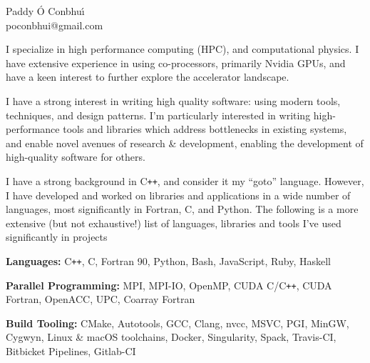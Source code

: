 \documentclass[11pt]{article}
\newcommand{\resumeSection}[1]{
    \par
    \large {\sc {#1}}
    \par
    \vspace{-0.9\baselineskip}
    \hrulefill
    \vspace{0.25\baselineskip}
    \par
}
\newenvironment{resumeSubSectionBody}{
    \par
    \vspace{-0.4\parskip}
    \begin{small}
    \par
} {
    \par
    \end{small}
    \par
}
\newenvironment{resumeDescription}{
    \vspace{-0.5\baselineskip}
    \begin{description}
} {
    \end{description}
}
\begin{document}


%
%
\begin{center}
    { \huge \textbf \sc Paddy \'O Conbhu\'\i } \\
    poconbhui@gmail.com
\end{center}




\resumeSection{Software Development}


%
%
\begin{resumeSubSectionBody}

    I specialize in high performance computing (HPC), and computational physics.
    I have extensive experience in using co-processors, primarily Nvidia GPUs,
    and have a keen interest to further explore the accelerator landscape.

    I have a strong interest in writing high quality software: using modern
    tools, techniques, and design patterns.
    I'm particularly interested in writing high-performance tools and libraries
    which address bottlenecks in existing systems, and enable novel avenues of
    research \& development, enabling the development of high-quality software
    for others.

    I have a strong background in C\verb!++!, and consider it my ``goto''
    language.
    However, I have developed and worked on libraries and applications in a wide
    number of languages, most significantly in Fortran, C, and Python.
    The following is a more extensive (but not exhaustive!) list of languages,
    libraries and tools I've used significantly in projects

    \begin{resumeDescription}
        \item{\bf Languages:}
            C\verb!++!, C, Fortran 90, Python, Bash,
            JavaScript, Ruby, Haskell

        \item{\bf Parallel Programming:}
            MPI, MPI-IO, OpenMP, CUDA C/C\verb!++!, CUDA Fortran,
            OpenACC, UPC, Coarray Fortran

        \item{\bf Build Tooling:}
            CMake, Autotools, GCC, Clang, nvcc, MSVC, PGI, MinGW, Cygwyn,
            Linux \& macOS toolchains,
            Docker, Singularity, Spack,
            Travis-CI, Bitbicket Pipelines, Gitlab-CI


\end{resumeDescription}
\end{resumeSubSectionBody}
\end{document}
